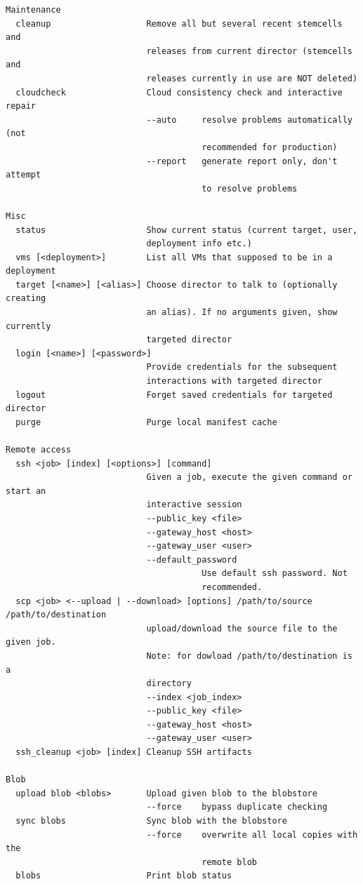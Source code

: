 \begin{adjustwidth}{2.5em}{2.5em}
\begin{verbatim}
Maintenance
  cleanup                   Remove all but several recent stemcells and 
                            releases from current director (stemcells and 
                            releases currently in use are NOT deleted) 
  cloudcheck                Cloud consistency check and interactive repair 
                            --auto     resolve problems automatically (not 
                                       recommended for production) 
                            --report   generate report only, don't attempt 
                                       to resolve problems 

Misc
  status                    Show current status (current target, user, 
                            deployment info etc.) 
  vms [<deployment>]        List all VMs that supposed to be in a deployment 
  target [<name>] [<alias>] Choose director to talk to (optionally creating 
                            an alias). If no arguments given, show currently 
                            targeted director 
  login [<name>] [<password>] 
                            Provide credentials for the subsequent 
                            interactions with targeted director 
  logout                    Forget saved credentials for targeted director 
  purge                     Purge local manifest cache 

Remote access
  ssh <job> [index] [<options>] [command] 
                            Given a job, execute the given command or start an 
                            interactive session 
                            --public_key <file> 
                            --gateway_host <host> 
                            --gateway_user <user> 
                            --default_password 
                                       Use default ssh password. Not 
                                       recommended. 
  scp <job> <--upload | --download> [options] /path/to/source /path/to/destination 
                            upload/download the source file to the given job. 
                            Note: for dowload /path/to/destination is a 
                            directory 
                            --index <job_index> 
                            --public_key <file> 
                            --gateway_host <host> 
                            --gateway_user <user> 
  ssh_cleanup <job> [index] Cleanup SSH artifacts 

Blob
  upload blob <blobs>       Upload given blob to the blobstore 
                            --force    bypass duplicate checking 
  sync blobs                Sync blob with the blobstore 
                            --force    overwrite all local copies with the 
                                       remote blob 
  blobs                     Print blob status 

\end{verbatim}
\end{adjustwidth}

